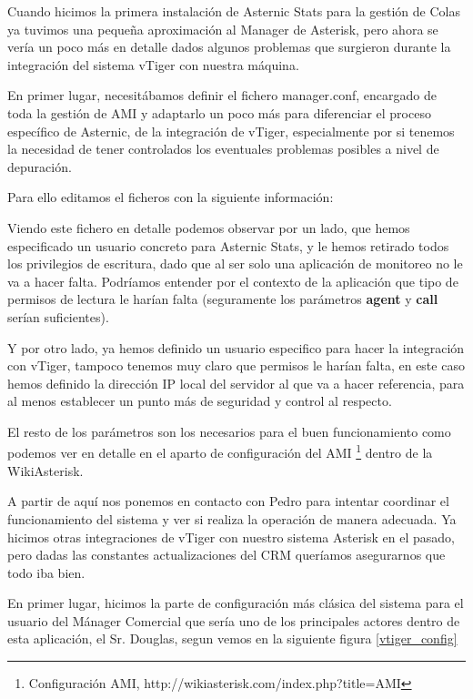 Cuando hicimos la primera instalación de Asternic Stats para la gestión de Colas ya tuvimos una pequeña aproximación al Manager de Asterisk, pero ahora se vería un poco más en detalle dados algunos problemas que surgieron durante la integración del sistema vTiger con nuestra máquina.

En primer lugar, necesitábamos definir el fichero manager.conf, encargado de toda la gestión de AMI y adaptarlo un poco más para diferenciar el proceso específico de Asternic, de la integración de vTiger, especialmente por si tenemos la necesidad de tener controlados los eventuales problemas posibles a nivel de depuración.

Para ello editamos el ficheros con la siguiente información:



Viendo este fichero en detalle podemos observar por un lado, que hemos especificado un usuario concreto para Asternic Stats, y le hemos retirado todos los privilegios de escritura, dado que al ser solo una aplicación de monitoreo no le va a hacer falta. Podríamos entender por el contexto de la aplicación que tipo de permisos de lectura le harían falta (seguramente los parámetros \textbf{agent} y \textbf{call} serían suficientes).

Y por otro lado, ya hemos definido un usuario especifico para hacer la integración con vTiger, tampoco tenemos muy claro que permisos le harían falta, en este caso hemos definido la dirección IP local del servidor al que va a hacer referencia, para al menos establecer un punto más de seguridad y control al respecto.

El resto de los parámetros son los necesarios para el buen funcionamiento como podemos ver en detalle en el aparto de configuración del AMI \footnote{Configuración AMI, http://wikiasterisk.com/index.php?title=AMI} dentro de la WikiAsterisk.

A partir de aquí nos ponemos en contacto con Pedro para intentar coordinar el funcionamiento del sistema y ver si realiza la operación de manera adecuada. Ya hicimos otras integraciones de vTiger con nuestro sistema Asterisk en el pasado, pero dadas las constantes actualizaciones del CRM queríamos asegurarnos que todo iba bien.

En primer lugar, hicimos la parte de configuración más clásica del sistema para el usuario del Mánager Comercial que sería uno de los principales actores dentro de esta aplicación, el Sr. Douglas, segun vemos en la siguiente figura \ref{vtiger_config}

